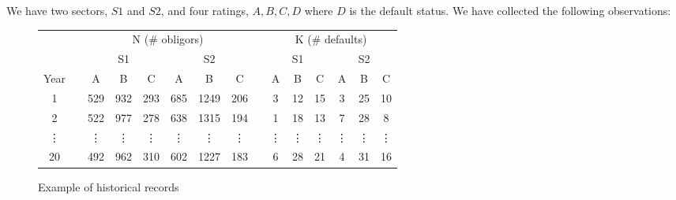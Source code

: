 \documentclass[11pt,fleqn]{book} %
\begin{document}
\begin{example}[]
We have two sectors, $S1$ and $S2$, and four ratings, $A, B, C, D$ where 
$D$ is the default status. We have collected the following observations:
\begin{figure}[h!]
	\centering
	\begin{tabular}{cc|c|c|c||c|c|c|  c  |c|c|c||c|c|c|}
	\cline{3-8} \cline{10-15}
	& & \multicolumn{6}{|c|}{N (\# obligors)} & & \multicolumn{6}{|c|}{K (\# defaults)} \\
	\cline{3-8} \cline{10-15}
	& & \multicolumn{3}{|c||}{S1} & \multicolumn{3}{|c|}{S2} & & \multicolumn{3}{|c||}{S1} & \multicolumn{3}{|c|}{S2} \\
	\cline{1-1} \cline{3-8} \cline{10-15}
	\multicolumn{1}{|c|}{Year} & & A & B & C & A & B & C & & A & B & C & A & B & C \\
	\cline{1-1} \cline{3-8} \cline{10-15}
	\multicolumn{1}{|c|}{1} & & 529 & 932 & 293 & 685 & 1249 & 206 & & 3 & 12 & 15 & 3 & 25 & 10 \\
	\cline{1-1} \cline{3-8} \cline{10-15}
	\multicolumn{1}{|c|}{2} & & 522 & 977 & 278 & 638 & 1315 & 194 & & 1 & 18 & 13 & 7 & 28 & 8 \\
	\cline{1-1} \cline{3-8} \cline{10-15}
	\multicolumn{1}{|c|}{\vdots} & & \vdots & \vdots & \vdots & \vdots & \vdots & \vdots & & \vdots & \vdots & \vdots & \vdots & \vdots & \vdots \\
	\cline{1-1} \cline{3-8} \cline{10-15}
	\multicolumn{1}{|c|}{20} & & 492 & 962 & 310 & 602 & 1227 & 183 & & 6 & 28 & 21 & 4 & 31 & 16 \\
	\cline{1-1} \cline{3-8} \cline{10-15}
	\end{tabular}
	\caption{Example of historical records}
\end{figure}
\end{example}
\end{document}
